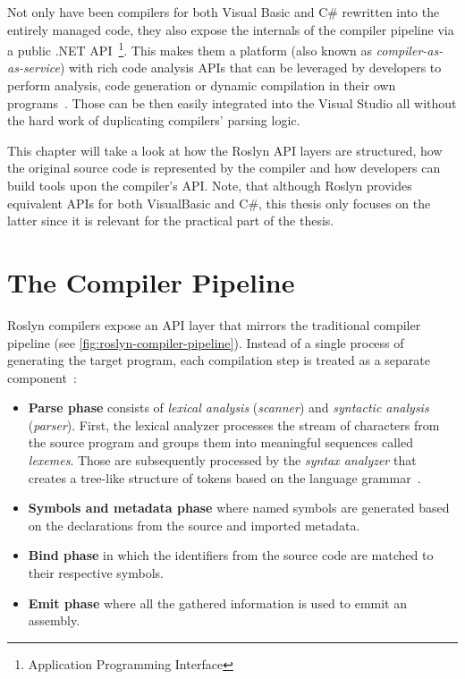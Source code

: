 \documentclass[
  digital, %
  table,   %
  lof,     %
  lot,     %
  oneside,
]{fithesis3}
\begin{document}
Not only have been compilers for both Visual Basic and C\# rewritten into the entirely managed code, they also expose the internals of the compiler pipeline via a public .NET API~\footnote{Application Programming Interface}. This makes them a platform (also known as \textit{compiler-as-as-service}) with rich code analysis APIs that can be leveraged by developers to perform analysis, code generation or dynamic compilation in their own programs~\cite{roslyn-succinctly}. Those can be then easily integrated into the Visual Studio all without the hard work of duplicating compilers' parsing logic.

This chapter will take a look at how the Roslyn API layers are structured, how the original source code is represented by the compiler and how developers can build tools upon the compiler's API. Note, that although Roslyn provides equivalent APIs for both VisualBasic and C\#, this thesis only focuses on the latter since it is relevant for the practical part of the thesis.  
  
\section{The Compiler Pipeline}
Roslyn compilers expose an API layer that mirrors the traditional compiler pipeline (see \ref{fig:roslyn-compiler-pipeline}). Instead of a single process of generating the target program, each compilation step is treated as a separate component~\cite{roslyn-overview}:

\begin{itemize}
  \item \textbf{Parse phase} consists of \textit{lexical analysis} (\textit{scanner}) and \textit{syntactic analysis} (\textit{parser}). First, the lexical analyzer processes the stream of characters from the source program and groups them into meaningful sequences called \textit{lexemes}. Those are subsequently processed by the \textit{syntax analyzer} that creates a tree-like structure of tokens based on the language grammar~\cite{dragon-book}.

  \item \textbf{Symbols and metadata phase} where named symbols are generated based on the declarations from the source and imported metadata.

  \item \textbf{Bind phase} in which the identifiers from the source code are matched to their respective symbols.

  \item \textbf{Emit phase} where all the gathered information is used to emmit an assembly.
\end{itemize}
\end{document}
